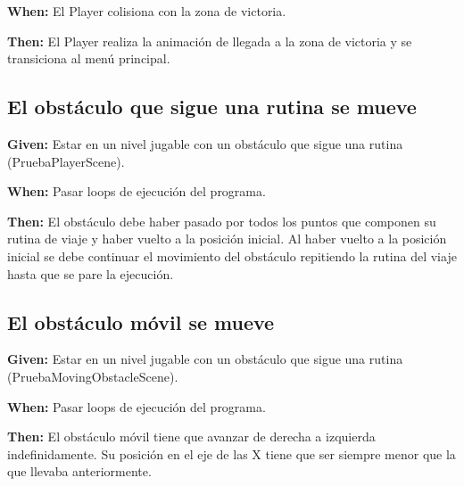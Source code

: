 \textbf{When:} El Player colisiona con la zona de victoria.

\textbf{Then:} El Player realiza la animación de llegada a la zona de victoria y se transiciona al menú principal.

\subsection{El obstáculo que sigue una rutina se mueve}
\textbf{Given:} Estar en un nivel jugable con un obstáculo que sigue una rutina (PruebaPlayerScene).

\textbf{When:} Pasar loops de ejecución del programa.

\textbf{Then:} El obstáculo debe haber pasado por todos los puntos que componen su rutina de viaje y haber vuelto a la posición inicial. Al haber vuelto a la posición inicial se debe continuar el movimiento del obstáculo repitiendo la rutina del viaje hasta que se pare la ejecución.

\subsection{El obstáculo móvil se mueve}
\textbf{Given:} Estar en un nivel jugable con un obstáculo que sigue una rutina (PruebaMovingObstacleScene).

\textbf{When:} Pasar loops de ejecución del programa.

\textbf{Then:} El obstáculo móvil tiene que avanzar de derecha a izquierda indefinidamente. Su posición en el eje de las X tiene que ser siempre menor que la que llevaba anteriormente.